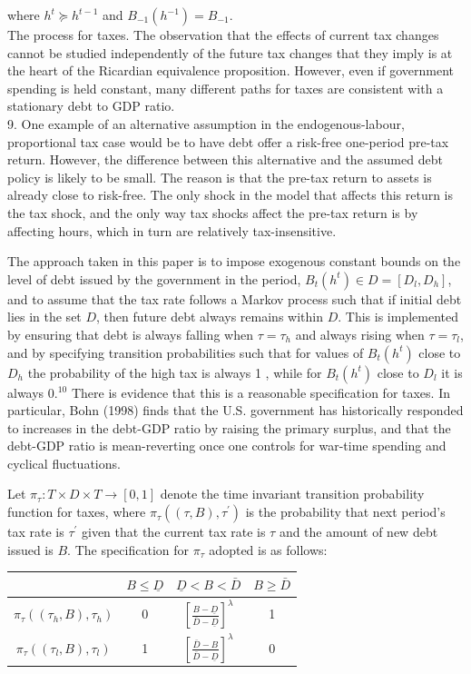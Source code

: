 \documentclass[11pt]{article}
\begin{document}
where $h^{t} \succeq h^{t-1}$ and $B_{-1}\left(h^{-1}\right)=B_{-1}$.\\
The process for taxes. The observation that the effects of current tax changes cannot be studied independently of the future tax changes that they imply is at the heart of the Ricardian equivalence proposition. However, even if government spending is held constant, many different paths for taxes are consistent with a stationary debt to GDP ratio.\\
9. One example of an alternative assumption in the endogenous-labour, proportional tax case would be to have debt offer a risk-free one-period pre-tax return. However, the difference between this alternative and the assumed debt policy is likely to be small. The reason is that the pre-tax return to assets is already close to risk-free. The only shock in the model that affects this return is the tax shock, and the only way tax shocks affect the pre-tax return is by affecting hours, which in turn are relatively tax-insensitive.

The approach taken in this paper is to impose exogenous constant bounds on the level of debt issued by the government in the period, $B_{t}\left(h^{t}\right) \in D=\left[D_{l}, D_{h}\right]$, and to assume that the tax rate follows a Markov process such that if initial debt lies in the set $D$, then future debt always remains within $D$. This is implemented by ensuring that debt is always falling when $\tau=\tau_{h}$ and always rising when $\tau=\tau_{l}$, and by specifying transition probabilities such that for values of $B_{t}\left(h^{t}\right)$ close to $D_{h}$ the probability of the high tax is always 1 , while for $B_{t}\left(h^{t}\right)$ close to $D_{l}$ it is always $0 .^{10}$ There is evidence that this is a reasonable specification for taxes. In particular, Bohn (1998) finds that the U.S. government has historically responded to increases in the debt-GDP ratio by raising the primary surplus, and that the debt-GDP ratio is mean-reverting once one controls for war-time spending and cyclical fluctuations.

Let $\pi_{\tau}: T \times D \times T \rightarrow[0,1]$ denote the time invariant transition probability function for taxes, where $\pi_{\tau}\left((\tau, B), \tau^{\prime}\right)$ is the probability that next period's tax rate is $\tau^{\prime}$ given that the current tax rate is $\tau$ and the amount of new debt issued is $B$. The specification for $\pi_{\tau}$ adopted is as follows:

\begin{center}
\begin{tabular}{cccc}
\hline
 & $B \leq \underline{D}$ & $\underline{D}<B<\bar{D}$ & $B \geq \bar{D}$ \\
\hline
$\pi_{\tau}\left(\left(\tau_{h}, B\right), \tau_{h}\right)$ & 0 & $\left[\frac{B-\underline{D}}{\bar{D}-\underline{D}}\right]^{\lambda}$ & 1 \\
$\pi_{\tau}\left(\left(\tau_{l}, B\right), \tau_{l}\right)$ & 1 & $\left[\frac{\bar{D}-B}{\bar{D}-\underline{D}}\right]^{\lambda}$ & 0 \\
\hline
\end{tabular}
\end{center}
\end{document}
